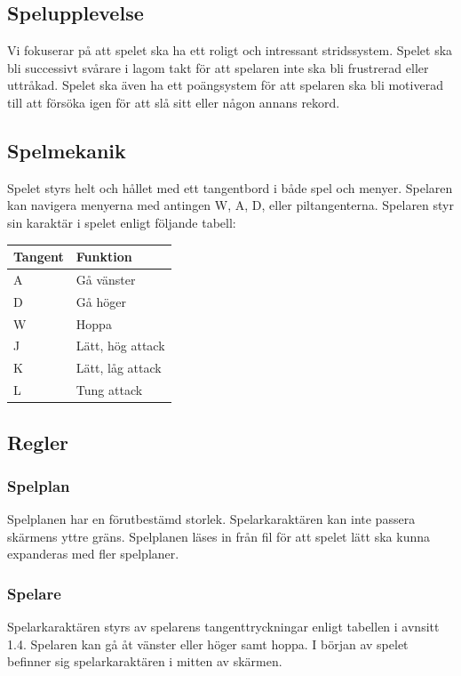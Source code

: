 \documentclass{TDP005mall}
\begin{document}
\subsection{Spelupplevelse}
Vi fokuserar på att spelet ska ha ett roligt och intressant stridssystem. Spelet ska bli successivt svårare i lagom takt för att spelaren inte ska bli frustrerad eller uttråkad. Spelet ska även ha ett poängsystem för att spelaren ska bli motiverad till att försöka igen för att slå sitt eller någon annans rekord.

\subsection{Spelmekanik}
Spelet styrs helt och hållet med ett tangentbord i både spel och menyer.
Spelaren kan navigera menyerna med antingen W, A, D, eller piltangenterna.
Spelaren styr sin karaktär i spelet enligt följande tabell:
\begin{table}[h!]
\begin{tabular}{|l|l|}
\hline
Tangent & Funktion         \\ \hline
A       & Gå vänster       \\ \hline
D       & Gå höger         \\ \hline
W       & Hoppa            \\ \hline
J       & Lätt, hög attack \\ \hline
K       & Lätt, låg attack \\ \hline
L       & Tung attack      \\ \hline

\end{tabular}
\end{table}
\subsection{Regler}
\subsubsection{Spelplan}
Spelplanen har en förutbestämd storlek. 
Spelarkaraktären kan inte passera skärmens yttre gräns. 
Spelplanen läses in från fil för att spelet lätt ska kunna expanderas med fler spelplaner.
\subsubsection{Spelare}
Spelarkaraktären styrs av spelarens tangenttryckningar enligt tabellen i avnsitt 1.4. Spelaren kan gå åt vänster eller höger samt hoppa. I början av spelet befinner sig spelarkaraktären i mitten av skärmen.
\end{document}
